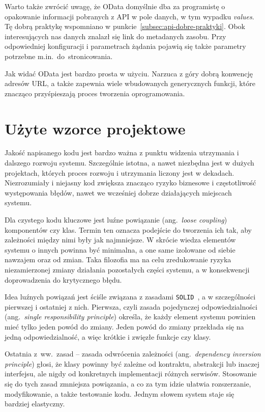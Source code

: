 Warto także zwrócić uwagę, że OData domyślnie dba za programistę o opakowanie informacji pobranych z API w pole danych, w tym wypadku \emph{values}. Tę dobrą praktykę wspomniano w punkcie~\ref{subsec:api-dobre-praktyki}. Obok interesujących nas danych znalazł się link do metadanych zasobu. Przy odpowiedniej konfiguracji i parametrach żądania pojawią się także parametry potrzebne m.in.~do~stronicowania.

Jak widać OData jest bardzo prosta w użyciu. Narzuca z góry dobrą konwencję adresów URL, a także zapewnia wiele wbudowanych generycznych funkcji, które znacząco przyśpieszają proces tworzenia oprogramowania.

\section{Użyte wzorce projektowe}
\label{sec:wzorce}

Jakość napisanego kodu jest bardzo ważna z punktu widzenia utrzymania i dalszego rozwoju systemu. Szczególnie istotna, a nawet niezbędna jest w dużych projektach, których proces rozwoju i utrzymania liczony jest w dekadach. Niezrozumiały i niejasny kod zwiększa znacząco ryzyko biznesowe i częstotliwość występowania błędów, nawet we wcześniej dobrze działających miejscach systemu.

Dla czystego kodu kluczowe jest luźne powiązanie (ang.~\emph{loose coupling}) komponentów czy klas. Termin ten oznacza podejście do tworzenia ich tak, aby zależności między nimi były jak najmniejsze. W skrócie wiedza elementów systemu o innych powinna być minimalna, a one same izolowane od siebie nawzajem oraz od zmian. Taka filozofia ma na celu zredukowanie ryzyka niezamierzonej zmiany działania pozostałych części systemu, a w konsekwencji doprowadzenia do krytycznego błędu. 

Idea luźnych powiązań jest ściśle związana z zasadami \texttt{SOLID}~\cite{clean-code}, a w szczególności pierwszej i ostatniej z nich. Pierwsza\label{ref:SRP}, czyli zasada pojedynczej odpowiedzialności (ang.~\emph{single responsibility principle}) określa, że każdy element systemu powinien mieć tylko jeden powód do zmiany. Jeden powód do zmiany przekłada się na jedną odpowiedzialność, a więc krótkie i zwięzłe funkcje czy klasy.

Ostatnia z~ww.~zasad -- zasada odwrócenia zależności (ang.~\emph{dependency inversion principle}) głosi, że klasy powinny być zależne od kontraktu, abstrakcji lub inaczej interfejsu, ale nigdy od konkretnych implementacji różnych serwisów. Stosowanie się do tych zasad zmniejsza powiązania, a co za tym idzie ułatwia rozszerzanie, modyfikowanie, a także testowanie kodu. Jednym słowem system staje się bardziej elastyczny.

